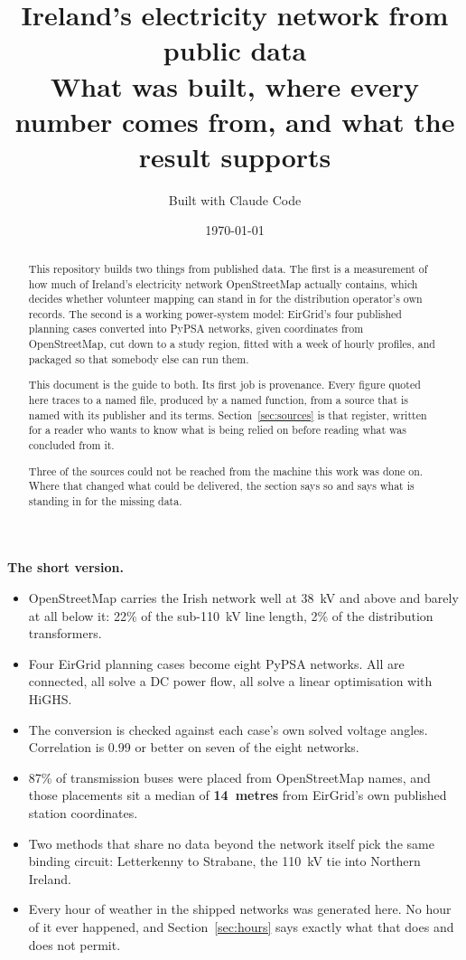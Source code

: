 \documentclass[11pt,a4paper]{article}
\title{\vspace{-1.5cm}\bfseries Ireland's electricity network from public data\\[2mm]
\large\mdseries\color{inksoft} What was built, where every number comes from,
and what the result supports}
\author{\normalsize\color{inksoft} Built with Claude Code}
\date{\normalsize\color{inksoft}\today}
\begin{document}
\maketitle
\thispagestyle{empty}

\begin{abstract}
\noindent
This repository builds two things from published data. The first is a
measurement of how much of Ireland's electricity network OpenStreetMap
actually contains, which decides whether volunteer mapping can stand in for
the distribution operator's own records. The second is a working power-system
model: EirGrid's four published planning cases converted into PyPSA networks,
given coordinates from OpenStreetMap, cut down to a study region, fitted with
a week of hourly profiles, and packaged so that somebody else can run them.

This document is the guide to both. Its first job is provenance. Every figure
quoted here traces to a named file, produced by a named function, from a
source that is named with its publisher and its terms. Section~\ref{sec:sources} is that
register, written for a reader who wants to know what is being relied on
before reading what was concluded from it.

Three of the sources could not be reached from the machine this work was done
on. Where that changed what could be delivered, the section says so and says
what is standing in for the missing data.
\end{abstract}

\vspace{4mm}
\noindent\colorbox{surface}{%
\begin{minipage}{\dimexpr\textwidth-2\fboxsep}
\small
\textbf{The short version.}
\begin{itemize}[leftmargin=1.2em]
\item OpenStreetMap carries the Irish network well at 38~kV and above and
      barely at all below it: 22\% of the sub-110~kV line length, 2\% of the
      distribution transformers.
\item Four EirGrid planning cases become eight PyPSA networks. All are
      connected, all solve a DC power flow, all solve a linear optimisation
      with HiGHS.
\item The conversion is checked against each case's own solved voltage angles.
      Correlation is 0.99 or better on seven of the eight networks.
\item 87\% of transmission buses were placed from OpenStreetMap names, and
      those placements sit a median of \textbf{14~metres} from EirGrid's own
      published station coordinates.
\item Two methods that share no data beyond the network itself pick the same
      binding circuit: Letterkenny to Strabane, the 110~kV tie into Northern
      Ireland.
\item Every hour of weather in the shipped networks was generated here. No
      hour of it ever happened, and Section~\ref{sec:hours} says exactly what
      that does and does not permit.
\end{itemize}
\end{minipage}}
\end{document}
